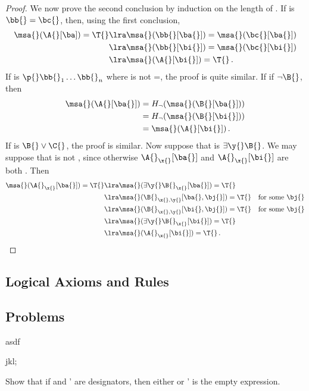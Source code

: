 \begin{proof}
    We now prove the second conclusion by induction on the length of \A{}.
    If \A{} is $\bb{} = \bc{}$, then, using the first conclusion,
    \begin{align}
        \msa{}(\A{}[\ba]) = \T{}
            &\lra \msa{}(\bb{}[\ba{}]) = \msa{}(\bc{}[\ba{}]) \\
            &\lra \msa{}(\bb{}[\bi{}]) = \msa{}(\bc{}[\bi{}]) \\
            &\lra \msa{}(\A{}[\bi{}]) = \T{}\,.
    \end{align}
    If \A{} is $\p{} \bb{}_1 \dots \bb{}_n$ where \p{} is not =, the proof is quite similar.
    If \A{} if $\neg \B{}$, then
    \begin{align}
        \msa{}(\A{}[\ba{}])
            &= H_\neg (\msa{} (\B{}[\ba{}])) \\
            &= H_\neg (\msa{} (\B{}[\bi{}])) \\
            &= \msa{} (\A{}[\bi{}])\,.
    \end{align}
    If \A{} is $\B{} \vee \C{}$, the proof is similar.
    Now suppose that \A{} is $\exists \y{} \B{}$.
    We may suppose that \y{} is not \x{}, since otherwise $\A{}_\x{}[\ba{}]$ and $\A{}_\x{}[\bi{}]$ are both \A{}.
    Then
    \begin{align}
        \msa{}(\A{}_\x{}[\ba{}]) = \T{}
            &\lra \msa{}(\exists \y{} \B{}_\x{} [\ba{}]) = \T{} \\
            &\lra \msa{}(\B{}_{\x{},\y{}} [\ba{}, \bj{}]) = \T{} \quad \text{for some \bj{}} \\
            &\lra \msa{}(\B{}_{\x{},\y{}} [\bi{}, \bj{}]) = \T{} \quad \text{for some \bj{}} \\
            &\lra \msa{}(\exists \y{} \B{}_\x{} [\bi{}]) = \T{} \\
            &\lra \msa{} (\A{}_\x{}[\bi{}]) = \T{}\,.
    \end{align}
\end{proof}


\subsection{Logical Axioms and Rules}


\subsection{Problems}

\begin{exercise}
    asdf
\end{exercise}

\begin{exercise}
    jkl;
\end{exercise}

\begin{exercise}
    Show that if \bu{}\bv{} and \bv{}\bv{}' are designators, then either \bv{} or \bv{}' is the empty expression.
\end{exercise}
